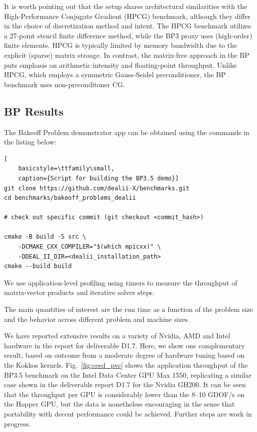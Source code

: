 \documentclass[a4paper,12pt]{article}
\begin{document}
It is worth pointing out that the setup shares architectural similarities
with the High-Performance Conjugate Gradient (HPCG) benchmark,
although they differ in the choice of discretization method and intent.
The HPCG benchmark utilizes a 27-point stencil finite difference method,
while the BP3 proxy uses (high-order) finite elements.
HPCG is typically limited by memory bandwidth due to the explicit (sparse)
matrix stroage.
In contrast, the matrix-free approach in the BP puts emphasis on arithmetic
intensity and floating-point throughput.
Unlike HPCG, which employs a symmetric Gauss-Seidel preconditioner,
the BP benchmark uses non-preconditoner CG.


\subsection{{BP Results}}

The Bakeoff Problem demonstrator app can be obtained using the commands in
the listing below:

\begin{lstlisting}[
    basicstyle=\ttfamily\small,
    caption={Script for building the BP3.5 demo}]
git clone https://github.com/dealii-X/benchmarks.git
cd benchmarks/bakeoff_problems_dealii

# check out specific commit (git checkout <commit_hash>)

cmake -B build -S src \
    -DCMAKE_CXX_COMPILER="$(which mpicxx)" \
    -DDEAL_II_DIR=<dealii_installation_path>
cmake --build build
\end{lstlisting}

We use application-level profiling using timers to measure the throughput
of matrix-vector products and iterative solver steps.

The main quantities of interest are the run time as a function of the problem size and the behavior across different problem and machine sizes.



We have reported extensive results on a variety of Nvidia, AMD and Intel hardware in the report for deliverable D1.7. Here, we show one complementary result, based on outcome from a moderate degree of hardware tuning based on the Kokkos kernels.
Fig.~\ref{fig:ceed_pvc} shows the application throughput of the BP3.5
benchmark on the Intel Data Center GPU Max 1550, replicating a similar case
shown in the deliverable report D1.7 for the Nvidia GH200. It can be seen that
the throughput per GPU is considerably lower than the 8--10 GDOF/s on the
Hopper GPU, but the data is nonetheless encouraging in the sense that
portability with decent performance could be achieved. Further steps are work
in progress.
\end{document}
